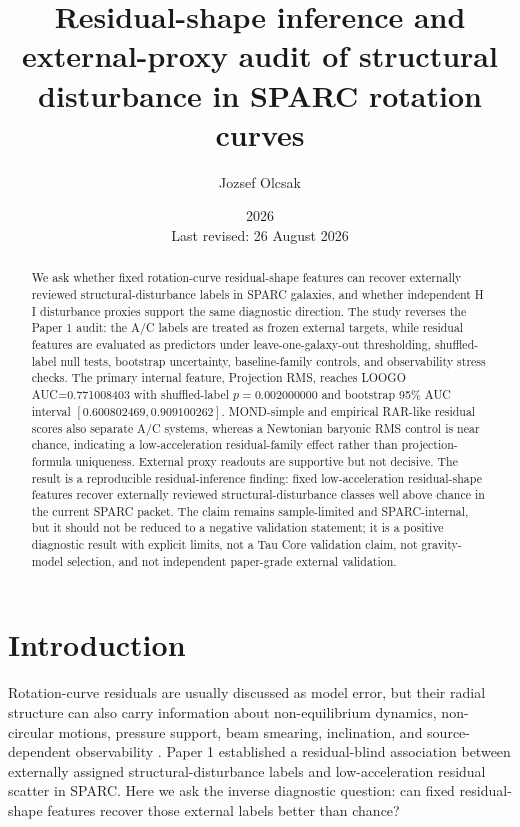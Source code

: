 \documentclass[11pt]{article}
\title{Residual-shape inference and external-proxy audit of structural disturbance in SPARC rotation curves}
\author{Jozsef Olcsak}
\date{2026\\Last revised: 26 August 2026}
\begin{document}
\maketitle

\begin{abstract}
We ask whether fixed rotation-curve residual-shape features can recover externally reviewed structural-disturbance labels in SPARC galaxies, and whether independent H\,I disturbance proxies support the same diagnostic direction. The study reverses the Paper 1 audit: the A/C labels are treated as frozen external targets, while residual features are evaluated as predictors under leave-one-galaxy-out thresholding, shuffled-label null tests, bootstrap uncertainty, baseline-family controls, and observability stress checks. The primary internal feature, Projection RMS, reaches LOOGO AUC=0.771008403 with shuffled-label $p=0.002000000$ and bootstrap 95\% AUC interval $[0.600802469,0.909100262]$. MOND-simple and empirical RAR-like residual scores also separate A/C systems, whereas a Newtonian baryonic RMS control is near chance, indicating a low-acceleration residual-family effect rather than projection-formula uniqueness. External proxy readouts are supportive but not decisive. The result is a reproducible residual-inference finding: fixed low-acceleration residual-shape features recover externally reviewed structural-disturbance classes well above chance in the current SPARC packet. The claim remains sample-limited and SPARC-internal, but it should not be reduced to a negative validation statement; it is a positive diagnostic result with explicit limits, not a Tau Core validation claim, not gravity-model selection, and not independent paper-grade external validation.
\end{abstract}

\section{Introduction}

Rotation-curve residuals are usually discussed as model error, but their radial structure can also carry information about non-equilibrium dynamics, non-circular motions, pressure support, beam smearing, inclination, and source-dependent observability \cite{Trachternach2008THINGS,Oman2019NonCircular}. Paper 1 established a residual-blind association between externally assigned structural-disturbance labels and low-acceleration residual scatter in SPARC. Here we ask the inverse diagnostic question: can fixed residual-shape features recover those external labels better than chance?
\end{document}
